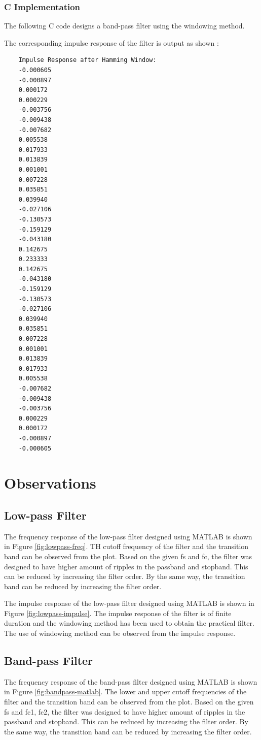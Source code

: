 \documentclass[a4paper,12pt]{article}
\begin{document}
\subsubsection*{C Implementation}

The following C code designs a band-pass filter using the windowing method.



The corresponding impulse response of the filter is output as shown :

\begin{lstlisting}
    Impulse Response after Hamming Window:
    -0.000605
    -0.000897
    0.000172
    0.000229
    -0.003756
    -0.009438
    -0.007682
    0.005538
    0.017933
    0.013839
    0.001001
    0.007228
    0.035851
    0.039940
    -0.027106
    -0.130573
    -0.159129
    -0.043180
    0.142675
    0.233333
    0.142675
    -0.043180
    -0.159129
    -0.130573
    -0.027106
    0.039940
    0.035851
    0.007228
    0.001001
    0.013839
    0.017933
    0.005538
    -0.007682
    -0.009438
    -0.003756
    0.000229
    0.000172
    -0.000897
    -0.000605
\end{lstlisting}

\section*{Observations}
\subsection*{Low-pass Filter}
The frequency response of the low-pass filter designed using MATLAB is shown in Figure \ref{fig:lowpass-freq}.
TH cutoff frequency of the filter and the transition band can be observed from the plot.
Based on the given fs and fc, the filter was designed to have higher amount of ripples in the passband and stopband.
This can be reduced by increasing the filter order. By the same way, the transition band can be reduced by increasing the filter order.

The impulse response of the low-pass filter designed using MATLAB is shown in Figure \ref{fig:lowpass-impulse}.
The impulse response of the filter is of finite duration and the windowing method has been used to obtain the practical filter.
The use of windowing method can be observed from the impulse response.

\subsection*{Band-pass Filter}
The frequency response of the band-pass filter designed using MATLAB is shown in Figure \ref{fig:bandpass-matlab}.
The lower and upper cutoff frequencies of the filter and the transition band can be observed from the plot.
Based on the given fs and fc1, fc2, the filter was designed to have higher amount of ripples in the passband and stopband.
This can be reduced by increasing the filter order. By the same way, the transition band can be reduced by increasing the filter order.
\end{document}
